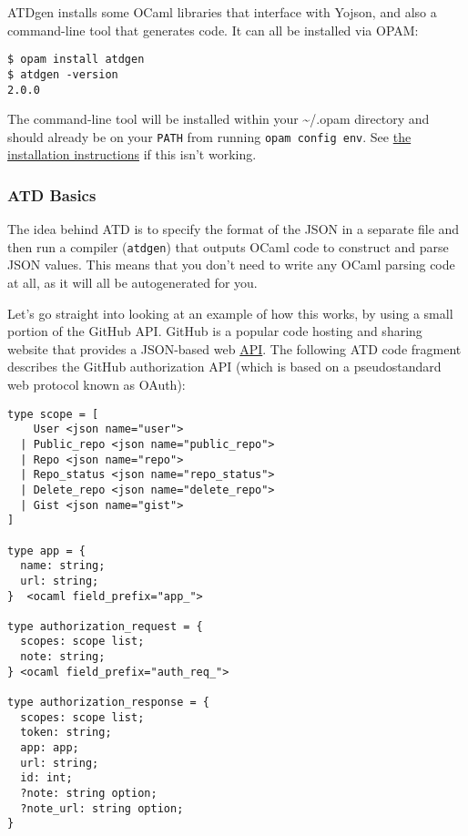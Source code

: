 ATDgen installs some OCaml libraries that interface with Yojson, and
also a command-line tool that generates code. It can all be installed
via OPAM:

\begin{lstlisting}
$ opam install atdgen
$ atdgen -version
2.0.0
\end{lstlisting}

The command-line tool will be installed within your
\textasciitilde/.opam directory and should already be on your
\passthrough{\lstinline!PATH!} from running
\passthrough{\lstinline!opam config env!}. See \href{install.html}{the
installation instructions} if this isn't working.

\hypertarget{atd-basics}{%
\subsubsection{ATD Basics}\label{atd-basics}}

The idea behind ATD is to specify the format of the JSON in a separate
file and then run a compiler (\passthrough{\lstinline!atdgen!}) that
outputs OCaml code to construct and parse JSON values. This means that
you don't need to write any OCaml parsing code at all, as it will all be
autogenerated for you. 

Let's go straight into looking at an example of how this works, by using
a small portion of the GitHub API. GitHub is a popular code hosting and
sharing website that provides a JSON-based web
\href{http://developer.github.com}{API}. The following ATD code fragment
describes the GitHub authorization API (which is based on a
pseudostandard web protocol known as OAuth): 

\begin{lstlisting}
type scope = [
    User <json name="user">
  | Public_repo <json name="public_repo">
  | Repo <json name="repo">
  | Repo_status <json name="repo_status">
  | Delete_repo <json name="delete_repo">
  | Gist <json name="gist">
]

type app = {
  name: string;
  url: string;
}  <ocaml field_prefix="app_">

type authorization_request = {
  scopes: scope list;
  note: string;
} <ocaml field_prefix="auth_req_">

type authorization_response = {
  scopes: scope list;
  token: string;
  app: app;
  url: string;
  id: int;
  ?note: string option;
  ?note_url: string option;
}
\end{lstlisting}

